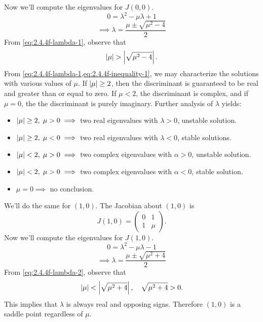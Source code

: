 \documentclass[12pt]{article}
\begin{document}
Now we'll compute the eigenvalues for $J(0,0)$.
\begin{equation*}
  0 = \lambda^2-\mu\lambda + 1
\end{equation*}
\begin{equation}
  \label{eq:2.4.4f-lambda-1}
  \implies\lambda = \frac{\mu \pm \sqrt{\mu^2-4}}{2}
\end{equation}
From \cref{eq:2.4.4f-lambda-1}, observe that
\begin{equation}
  \label{eq:2.4.4f-inequality-1}
  \abs{\mu}>\abs{\sqrt{\mu^2-4}}.
\end{equation}
From \cref{eq:2.4.4f-lambda-1,eq:2.4.4f-inequality-1}, we may characterize the
solutions with various values of $\mu$. If $\left|{\mu}\right|\ge2$, then the
discriminant is guaranteed to be real and greater than or equal to zero. If
$\mu<2$, the discriminant is complex, and if $\mu=0$, the the discriminant is
purely imaginary. Further analysis of $\lambda$ yields:
\begin{itemize}
\item $\left|{\mu}\right|\ge2,\;\mu>0 \implies$ two real eigenvalues with $\lambda>0$, unstable solution.
\item $\left|{\mu}\right|\ge2,\;\mu<0 \implies$ two real eigenvalues with $\lambda<0$, stable solutions.
\item $\left|{\mu}\right|<2,\;\mu>0 \implies$ two complex eigenvalues with $\alpha>0$, unstable solution.
\item $\left|{\mu}\right|<2,\;\mu>0 \implies$ two complex eigenvalues with $\alpha<0$, stable solution.
\item $\mu=0 \implies$ no conclusion.
\end{itemize}
We'll do the same for $(1,0)$. The Jacobian about $(1,0)$ is
\begin{equation*}
  J(1,0) =
  \begin{pmatrix}
    0 & 1 \\ 1 & \mu
  \end{pmatrix}.
\end{equation*}
Now we'll compute the eigenvalues for $J(1,0)$.
\begin{equation*}
  0 = \lambda^2-\mu\lambda-1
\end{equation*}
\begin{equation}
  \label{eq:2.4.4f-lambda-2}
  \implies \lambda = \frac{\mu \pm \sqrt{\mu^2+4}}{2}
\end{equation}
From \cref{eq:2.4.4f-lambda-2}, observe that
\begin{equation}
  \label{eq:2.4.4f-inequality-2}
  \left|{\mu}\right|<\left|{\sqrt{\mu^2+4}}\right|,\quad \sqrt{\mu^2+4}>0.
\end{equation}
This implies that $\lambda$ is always real and opposing signs. Therefore $(1,0)$
is a saddle point regardless of $\mu$.
\end{document}
